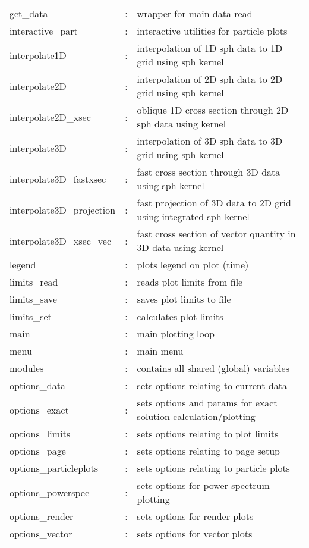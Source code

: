 \documentclass[a4paper,12pt]{article}
\begin{document}
\begin{longtable}{|lcp{}|}
get\_data           & : & wrapper for main data read\\
interactive\_part   & : & interactive utilities for particle plots\\
interpolate1D	 & : & interpolation of 1D sph data to 1D grid using sph kernel\\
interpolate2D	 & : & interpolation of 2D sph data to 2D grid using sph kernel  \\   
interpolate2D\_xsec & : & oblique 1D cross section through 2D sph data using kernel\\
interpolate3D	 & : & interpolation of 3D sph data to 3D grid using sph kernel\\
interpolate3D\_fastxsec   & : & fast cross section through 3D data using sph kernel\\
interpolate3D\_projection & : & fast projection of 3D data to 2D grid using integrated sph kernel\\
interpolate3D\_xsec\_vec   & : & fast cross section of vector quantity in 3D data using kernel\\
legend		       & : & plots legend on plot (time)\\
limits\_read              & : & reads plot limits from file\\
limits\_save              & : & saves plot limits to file\\
limits\_set               & : & calculates plot limits\\
main               & : & main plotting loop\\
menu               & : & main menu\\
modules		 & : & contains all shared (global) variables\\
options\_data       & : & sets options relating to current data\\
options\_exact	 & : & sets options and params for exact solution calculation/plotting\\
options\_limits     & : & sets options relating to plot limits\\
options\_page       & : & sets options relating to page setup\\
options\_particleplots & : & sets options relating to particle plots\\
options\_powerspec  & : & sets options for power spectrum plotting\\
options\_render	 & : & sets options for render plots\\
options\_vector	 & : & sets options for vector plots\\

\end{longtable}
\end{document}
